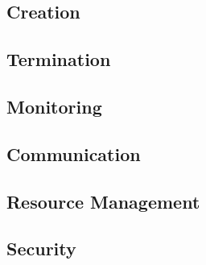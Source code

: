 


\subsection{Creation}
\label{ch:fundamentals/processes/creation}
\subsection{Termination}
\label{ch:fundamentals/processes/termination}
\subsection{Monitoring}
\label{ch:fundamentals/processes/monitoring}
\subsection{Communication}
\label{ch:fundamentals/processes/communication}
\subsection{Resource Management}
\label{ch:fundamentals/processes/resource-management}
\subsection{Security}
\label{ch:fundamentals/processes/security}